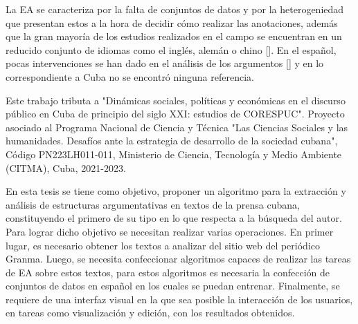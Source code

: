 La EA se caracteriza por la falta de conjuntos de datos y 
por la heterogeniedad que presentan estos a la hora de decidir cómo realizar las 
anotaciones, además que la gran mayoría de los estudios realizados en el campo se encuentran en 
un reducido conjunto de idiomas como el inglés, alemán o chino [\cite{eger2018cross}]. 
En el español, pocas intervenciones se han dado en el análisis de los argumentos [\cite{esteve2020mineria}] y en 
lo correspondiente a Cuba no se encontró ninguna referencia. 


Este trabajo tributa a "Dinámicas sociales, políticas y económicas en el discurso público 
en Cuba de principio del siglo XXI: estudios de CORESPUC". Proyecto 
asociado al Programa Nacional de Ciencia y Técnica "Las Ciencias Sociales y las humanidades. 
Desafíos ante la estrategia de desarrollo de la sociedad cubana", Código PN223LH011-011, Ministerio
de Ciencia, Tecnología y Medio Ambiente (CITMA), Cuba, 2021-2023.


En esta tesis se tiene como objetivo, proponer un algoritmo para 
la extracción y análisis de estructuras argumentativas en textos 
de la prensa cubana, constituyendo el primero de su tipo en lo que respecta a la búsqueda del autor. 
Para lograr dicho objetivo se necesitan realizar varias operaciones.
En primer lugar, es necesario obtener los textos a analizar del sitio 
web del periódico Granma. Luego, se necesita confeccionar algoritmos capaces de realizar las tareas 
de EA sobre estos textos, para estos algoritmos es necesaria la confección de conjuntos 
de datos en español en los cuales se puedan entrenar. Finalmente, se requiere de una interfaz visual 
en la que sea posible la interacción de los usuarios, en tareas como visualización y edición, 
con los resultados obtenidos. 

